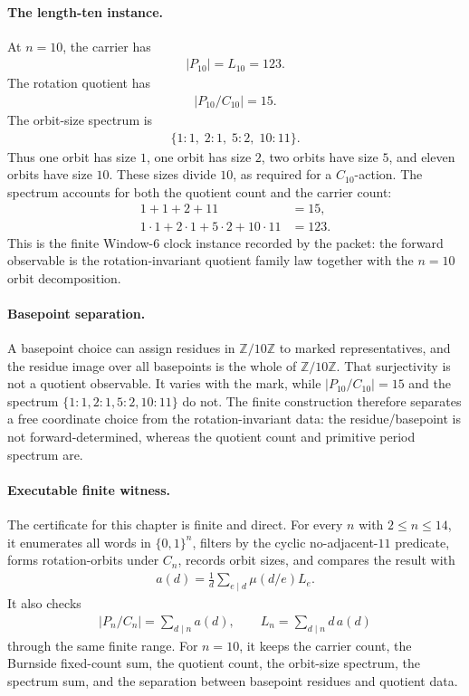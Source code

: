 \paragraph{The length-ten instance.}
At $n=10$, the carrier has
$$
\begin{aligned}
|P_{10}|=L_{10}=123.
\end{aligned}
$$
The rotation quotient has
$$
\begin{aligned}
|P_{10}/C_{10}|=15.
\end{aligned}
$$
The orbit-size spectrum is
$$
\begin{aligned}
\{1:1,\;2:1,\;5:2,\;10:11\}.
\end{aligned}
$$
Thus one orbit has size $1$, one orbit has size $2$, two orbits have size $5$, and eleven orbits have size $10$. These sizes divide $10$, as required for a $C_{10}$-action. The spectrum accounts for both the quotient count and the carrier count:
$$
\begin{aligned}
1+1+2+11&=15,\\
1\cdot 1+2\cdot 1+5\cdot 2+10\cdot 11&=123.
\end{aligned}
$$
This is the finite Window-6 clock instance recorded by the packet: the forward observable is the rotation-invariant quotient family law together with the $n=10$ orbit decomposition.

\paragraph{Basepoint separation.}
A basepoint choice can assign residues in $\mathbb Z/10\mathbb Z$ to marked representatives, and the residue image over all basepoints is the whole of $\mathbb Z/10\mathbb Z$. That surjectivity is not a quotient observable. It varies with the mark, while $|P_{10}/C_{10}|=15$ and the spectrum $\{1:1,2:1,5:2,10:11\}$ do not. The finite construction therefore separates a free coordinate choice from the rotation-invariant data: the residue/basepoint is not forward-determined, whereas the quotient count and primitive period spectrum are.

\paragraph{Executable finite witness.}
The certificate for this chapter is finite and direct. For every $n$ with $2\leq n\leq 14$, it enumerates all words in $\{0,1\}^n$, filters by the cyclic no-adjacent-$11$ predicate, forms rotation-orbits under $C_n$, records orbit sizes, and compares the result with
$$
\begin{aligned}
a(d)=\frac{1}{d}\sum_{e\mid d}\mu(d/e)L_e.
\end{aligned}
$$
It also checks
$$
\begin{aligned}
|P_n/C_n|=\sum_{d\mid n}a(d),\qquad L_n=\sum_{d\mid n}d\,a(d)
\end{aligned}
$$
through the same finite range. For $n=10$, it keeps the carrier count, the Burnside fixed-count sum, the quotient count, the orbit-size spectrum, the spectrum sum, and the separation between basepoint residues and quotient data.

